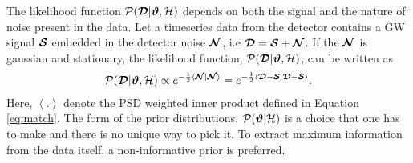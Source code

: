 The likelihood function $\mathcal{P}(\boldsymbol{\mathcal{D}}|\boldsymbol{\vartheta},\mathcal{H})$ depends on both the signal and the nature of noise present in the data. Let a timeseries data from the detector contains a GW signal $\boldsymbol{\mathcal{S}}$ embedded in the detector noise $\boldsymbol{\mathcal{N}}$, i.e $\boldsymbol{\mathcal{D}}= \boldsymbol{\mathcal{S}}+\boldsymbol{\mathcal{N}}$. If the $\boldsymbol{\mathcal{N}}$ is gaussian and stationary, the likelihood function, $\mathcal{P}(\boldsymbol{\mathcal{D}}|\boldsymbol{\vartheta},\mathcal{H})$, can be written as 
\begin{align}
\mathcal{P}(\boldsymbol{\mathcal{D}}|\boldsymbol{\vartheta},\mathcal{H}) \propto e^{-\frac{1}{2} \left\langle \boldsymbol{\mathcal{N}}|\boldsymbol{\mathcal{N}}  \right\rangle}= e^{-\frac{1}{2} \left\langle \boldsymbol{\mathcal{D}} - \boldsymbol{\mathcal{S}}|\boldsymbol{\mathcal{D}} - \boldsymbol{\mathcal{S}}  \right\rangle}.
\end{align}
Here, $\left\langle . \right\rangle$ denote the PSD weighted inner product defined in Equation \ref{eq:match}. The form of the prior distributions, $\mathcal{P}(\boldsymbol{\vartheta}|\mathcal{H})$ is a choice that one has to make and there is no unique way to pick it. To extract maximum information from the data itself, a non-informative prior is preferred. 







